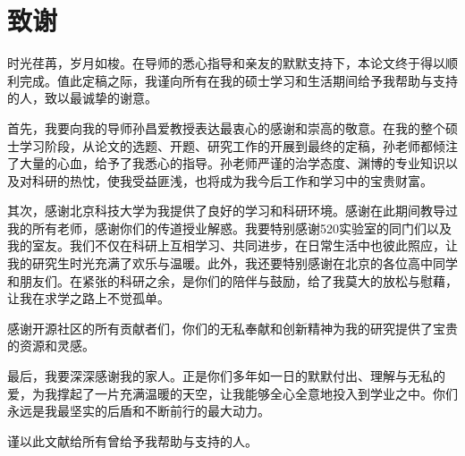 ﻿
\chapter*{致\quad\quad 谢}

时光荏苒，岁月如梭。在导师的悉心指导和亲友的默默支持下，本论文终于得以顺利完成。值此定稿之际，我谨向所有在我的硕士学习和生活期间给予我帮助与支持的人，致以最诚挚的谢意。

首先，我要向我的导师孙昌爱教授表达最衷心的感谢和崇高的敬意。在我的整个硕士学习阶段，从论文的选题、开题、研究工作的开展到最终的定稿，孙老师都倾注了大量的心血，给予了我悉心的指导。孙老师严谨的治学态度、渊博的专业知识以及对科研的热忱，使我受益匪浅，也将成为我今后工作和学习中的宝贵财富。

其次，感谢北京科技大学为我提供了良好的学习和科研环境。感谢在此期间教导过我的所有老师，感谢你们的传道授业解惑。我要特别感谢520实验室的同门们以及我的室友。我们不仅在科研上互相学习、共同进步，在日常生活中也彼此照应，让我的研究生时光充满了欢乐与温暖。此外，我还要特别感谢在北京的各位高中同学和朋友们。在紧张的科研之余，是你们的陪伴与鼓励，给了我莫大的放松与慰藉，让我在求学之路上不觉孤单。

感谢开源社区的所有贡献者们，你们的无私奉献和创新精神为我的研究提供了宝贵的资源和灵感。

最后，我要深深感谢我的家人。正是你们多年如一日的默默付出、理解与无私的爱，为我撑起了一片充满温暖的天空，让我能够全心全意地投入到学业之中。你们永远是我最坚实的后盾和不断前行的最大动力。

谨以此文献给所有曾给予我帮助与支持的人。
